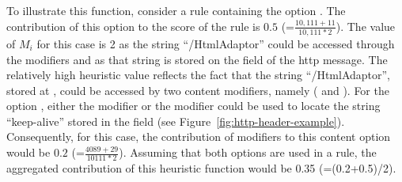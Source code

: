 \documentclass[sigconf,review, anonymous]{acmart}
\begin{document}


    
To illustrate this function, consider a rule containing the option
. The contribution of this option to
the score of the rule is $0.5$ (=$\frac{10,111+11}{10,111*2}$). The
value of $M_i$ for this case is 2 as the string ``/HtmlAdaptor'' could
be accessed through the modifiers  and
 as that string is stored on the
 field of the http message. The relatively high heuristic value reflects the fact that
the string ``/HtmlAdaptor'', stored at , could be
accessed by two content modifiers, namely ( and
).  For the option , either the modifier  or the
modifier  could be used to locate the string
``keep-alive'' stored in the field  (see
Figure~\ref{fig:http-header-example}). Consequently, for this case,
the contribution of modifiers to this content option would be $0.2$
(=$\frac{4089+29}{10111*2}$). Assuming that both options are used in a
rule, the aggregated contribution of this heuristic function would be
0.35 (=(0.2+0.5)/2).
\end{document}
